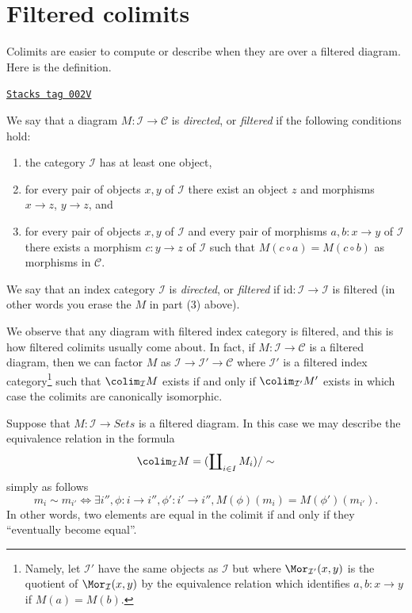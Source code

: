 \section{Filtered colimits}
\label{categories-section-directed-colimits}
Colimits are easier to compute or describe when they
are over a filtered diagram. Here is the definition.

\begin{definition}[Directed]
\label{categories-definition-directed}
\href{https://stacks.math.columbia.edu/tag/002V}{\texttt{Stacks tag 002V}}

We say that a diagram $M : \mathcal{I} \to \mathcal{C}$ is {\it directed},
or {\it filtered} if the following conditions hold:
\begin{enumerate}
\item the category $\mathcal{I}$ has at least one object,
\item for every pair of objects $x, y$ of $\mathcal{I}$
there exist an object $z$ and morphisms $x \to z$,
$y \to z$, and
\item for every pair of objects $x, y$ of $\mathcal{I}$
and every pair of morphisms $a, b : x \to y$ of $\mathcal{I}$
there exists a morphism $c : y \to z$ of $\mathcal{I}$
such that $M(c \circ a) = M(c \circ b)$ as morphisms in $\mathcal{C}$.
\end{enumerate}
We say that an index category $\mathcal{I}$ is {\it directed}, or
{\it filtered} if $\text{id} : \mathcal{I} \to \mathcal{I}$ is filtered
(in other words you erase the $M$ in part (3) above).
\end{definition}

We observe that any diagram with filtered index category is filtered,
and this is how filtered colimits usually come about. In fact, if
$M : \mathcal{I} \to \mathcal{C}$ is a filtered diagram, then we
can factor $M$ as $\mathcal{I} \to \mathcal{I}' \to \mathcal{C}$
where $\mathcal{I}'$ is a filtered index category\footnote{Namely, let
$\mathcal{I}'$ have the same objects as $\mathcal{I}$ but
where $\Mor_{\mathcal{I}'}(x, y)$ is the quotient of $\Mor_\mathcal{I}(x, y)$
by the equivalence relation which identifies
$a, b : x \to y$ if $M(a) = M(b)$.}
such that $\colim_\mathcal{I} M$ exists if and only if
$\colim_{\mathcal{I}'} M'$ exists in which case the colimits are
canonically isomorphic.

\medskip\noindent
Suppose that $M : \mathcal{I} \to \textit{Sets}$ is a filtered diagram. In
this case we may describe the equivalence relation in the formula
$$
\colim_\mathcal{I} M
=
(\coprod\nolimits_{i\in I} M_i)/\sim
$$
simply as follows
$$
m_i \sim m_{i'}
\Leftrightarrow
\exists i'', \phi : i \to i'', \phi': i' \to i'',
M(\phi)(m_i) = M(\phi')(m_{i'}).
$$
In other words, two elements are equal in the colimit if and only if
they ``eventually become equal''.

